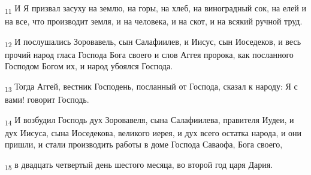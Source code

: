 \begin{tcolorbox}
\textsubscript{11} И Я призвал засуху на землю, на горы, на хлеб, на виноградный сок, на елей и на все, что производит земля, и на человека, и на скот, и на всякий ручной труд.
\end{tcolorbox}
\begin{tcolorbox}
\textsubscript{12} И послушались Зоровавель, сын Салафиилев, и Иисус, сын Иоседеков, и весь прочий народ гласа Господа Бога своего и слов Аггея пророка, как посланного Господом Богом их, и народ убоялся Господа.
\end{tcolorbox}
\begin{tcolorbox}
\textsubscript{13} Тогда Аггей, вестник Господень, посланный от Господа, сказал к народу: Я с вами! говорит Господь.
\end{tcolorbox}
\begin{tcolorbox}
\textsubscript{14} И возбудил Господь дух Зоровавеля, сына Салафиилева, правителя Иудеи, и дух Иисуса, сына Иоседекова, великого иерея, и дух всего остатка народа, и они пришли, и стали производить работы в доме Господа Саваофа, Бога своего,
\end{tcolorbox}
\begin{tcolorbox}
\textsubscript{15} в двадцать четвертый день шестого месяца, во второй год царя Дария.
\end{tcolorbox}
